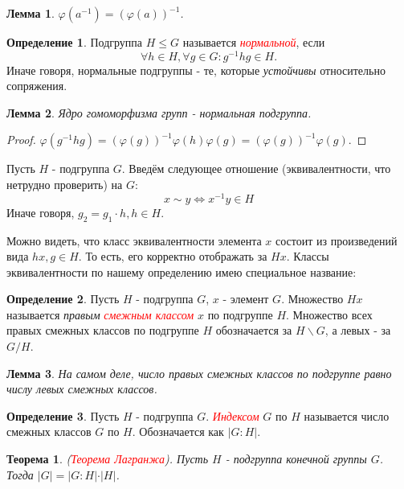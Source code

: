 \documentclass[a4paper,100pt]{article}
\theoremstyle{indented}
\newtheorem{theorem}{Теорема}
\newtheorem{lemma}{Лемма}
\theoremstyle{definition}
\newtheorem{defn}{Определение}
\theoremstyle{remark}
\begin{document}
\begin{lemma}
    $\varphi(a^{-1})=(\varphi(a))^{-1}$.
\end{lemma}

\begin{defn}
    Подгруппа $H\leq G$ называется \hypertarget{n87}{\textcolor{red}{\textit{нормальной}}}, если 
    \[
        \forall h\in H, \forall g\in G: g^{-1}hg\in H.
    \]
    Иначе говоря, нормальные подгруппы - те, которые \textit{устойчивы} относительно сопряжения.
\end{defn}

\begin{lemma}
    Ядро гомоморфизма групп - нормальная подгруппа.
\end{lemma}

\begin{proof}
    $\varphi(g^{-1}hg)=(\varphi(g))^{-1}\varphi(h)\varphi(g)=(\varphi(g))^{-1}\varphi(g)$.
\end{proof}

Пусть $H$ - подгруппа $G$. Введём следующее отношение (эквивалентности, что нетрудно проверить) на $G$:
\[
    x\sim y \Leftrightarrow x^{-1}y\in H
\]
Иначе говоря, $g_2=g_1\cdot h, h\in H$.

Можно видеть, что класс эквивалентности элемента $x$ состоит из произведений вида $hx, g\in H$. То есть, его корректно отображать за $Hx$. Классы эквивалентности по нашему определению имею специальное название:

\begin{defn}
    Пусть $H$ - подгруппа $G$, $x$ - элемент $G$. Множество $Hx$ называется \textit{правым} \hypertarget{n88}{\textcolor{red}{\textit{смежным классом}}} $x$ по подгруппе $H$. Множество всех правых смежных классов по подгруппе $H$ обозначается за $H\backslash G$, а левых - за $G/H$.
\end{defn}

\begin{lemma}
    На самом деле, число правых смежных классов по подгруппе равно числу левых смежных классов.
\end{lemma}

\begin{defn}
    Пусть $H$ - подгруппа $G$. \hypertarget{n89}{\textcolor{red}{\textit{Индексом}}} $G$ по $H$ называется число смежных классов $G$ по $H$. Обозначается как $\vert G:H\vert$. 
\end{defn}

\begin{theorem}
    (\hypertarget{n90}{\textcolor{red}{\textit{Теорема Лагранжа}}}). Пусть $H$ - подгруппа конечной группы $G$. Тогда $\vert G\vert = \vert G:H\vert \cdot \vert H \vert$.
\end{theorem}
\end{document}
